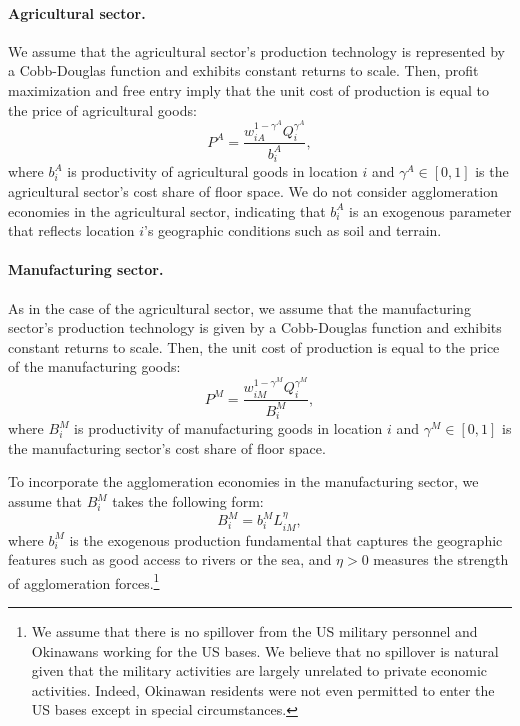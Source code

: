 \documentclass[12pt, unicode, a4paper]{article}
\newcommand{\1}{\mbox{1}\hspace{-0.25em}\mbox{l}} %
\begin{document}
\paragraph{Agricultural sector.}
We assume that the agricultural sector's production technology is represented by a Cobb-Douglas function and exhibits constant returns to scale. Then, profit maximization and free entry imply that the unit cost of production is equal to the price of agricultural goods:
\begin{equation}
\label{eq:priceA}
    P^A=\frac{w_{iA}^{1-\gamma^A} Q_i^{\gamma^A}}{b_i^A},
\end{equation}
where $b_i^A$ is productivity of agricultural goods in location $i$ and $\gamma^A \in [0,1]$ is the agricultural sector's cost share of floor space. We do not consider agglomeration economies in the agricultural sector, indicating that $b_i^A$ is an exogenous parameter that reflects location $i$'s geographic conditions such as soil and terrain.

\paragraph{Manufacturing sector.}
As in the case of the agricultural sector, we assume that the manufacturing sector's production technology is given by a Cobb-Douglas function and exhibits constant returns to scale. Then, the unit cost of production is equal to the price of the manufacturing goods:
\begin{equation}
\label{eq:priceM}
    P^M=\frac{w_{iM}^{1-\gamma^M} Q_i^{\gamma^M}}{B_i^M},
\end{equation}
where $B_i^M$ is productivity of manufacturing goods in location $i$ and $\gamma^M \in [0,1]$ is the manufacturing sector's cost share of floor space.

To incorporate the agglomeration economies in the manufacturing sector, we assume that $B_i^M$ takes the following form:
\begin{equation}
\label{eq:productivityM}
    B_i^M=b_i^M L_{iM}^\eta,
\end{equation}
where $b_i^M$ is the exogenous production fundamental that captures the geographic features such as good access to rivers or the sea, and $\eta>0$ measures the strength of agglomeration forces.\footnote{We assume that there is no spillover from the US military personnel and Okinawans working for the US bases. We believe that no spillover is natural given that the military activities are largely unrelated to private economic activities. Indeed, Okinawan residents were not even permitted to enter the US bases except in special circumstances.
}
\end{document}
